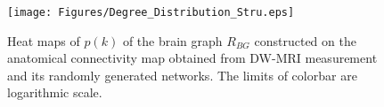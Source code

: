 \begin{figure}[htbp]
 
  \centering
	 \texttt{[image: Figures/Degree\_Distribution\_Stru.eps]}
  \caption[Degree Distribution, ACM]{Heat maps of $p(k)$ of the brain graph $R_{BG}$ constructed on the anatomical connectivity map obtained from DW-MRI measurement and its randomly generated networks. The limits of colorbar are logarithmic scale.} 
    \label{fig:Degree Distribution, ACM}
 	
\end{figure}



